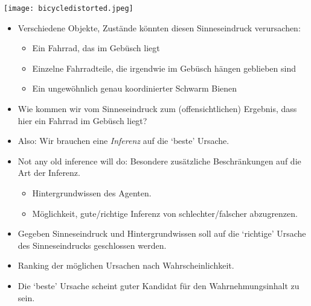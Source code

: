 \documentclass[12pt, handout]{beamer}
\begin{document}
\begin{frame}[plain]
  \begin{center}
    \texttt{[image: bicycledistorted.jpeg]}
  \end{center}
\end{frame}

\begin{frame}
  \begin{itemize}[<+->]
  \item Verschiedene Objekte, Zustände könnten diesen Sinneseindruck
    verursachen:
    \begin{itemize}[<+->]
    \item Ein Fahrrad, das im Gebüsch liegt
    \item Einzelne Fahrradteile, die irgendwie im Gebüsch hängen
      geblieben sind
    \item Ein ungewöhnlich genau koordinierter Schwarm Bienen
    \end{itemize}
  \item Wie kommen wir vom Sinneseindruck zum (offensichtlichen)
    Ergebnis, dass hier ein Fahrrad im Gebüsch liegt?
  \end{itemize}

\end{frame}


\begin{frame}
  \begin{itemize}[<+->]
  \item Also: Wir brauchen eine \emph{Inferenz} auf die `beste' Ursache.
  \item Not any old inference will do: Besondere zusätzliche
    Beschränkungen auf die Art der Inferenz.
    \begin{itemize}[<+->]
    \item Hintergrundwissen des Agenten.
    \item Möglichkeit, gute/richtige Inferenz von schlechter/falscher
      abzugrenzen.
    \end{itemize}
  \end{itemize}
\end{frame}


\begin{frame}
  \begin{itemize}[<+->]
  \item Gegeben Sinneseindruck und Hintergrundwissen soll auf die
    `richtige' Ursache des Sinneseindrucks geschlossen werden.
  \item Ranking der möglichen Ursachen nach Wahrscheinlichkeit.
  \item Die `beste' Ursache scheint guter Kandidat für den
    Wahrnehmungsinhalt zu sein.
  \end{itemize}

\end{frame}
\end{document}
